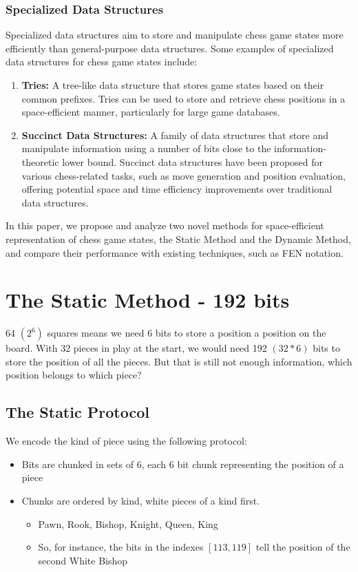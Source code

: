 \documentclass{article}
\begin{document}
\subsubsection{Specialized Data Structures}  
Specialized data structures aim to store and manipulate chess game states more efficiently than general-purpose data structures. Some examples of specialized data structures for chess game states include:  
   
\begin{enumerate}  
  \item \textbf{Tries:} A tree-like data structure that stores game states based on their common prefixes. Tries can be used to store and retrieve chess positions in a space-efficient manner, particularly for large game databases.  
    
  \item \textbf{Succinct Data Structures:} A family of data structures that store and manipulate information using a number of bits close to the information-theoretic lower bound. Succinct data structures have been proposed for various chess-related tasks, such as move generation and position evaluation, offering potential space and time efficiency improvements over traditional data structures.  
\end{enumerate}  
   
In this paper, we propose and analyze two novel methods for space-efficient representation of chess game states, the Static Method and the Dynamic Method, and compare their performance with existing techniques, such as FEN notation.

\newpage
\section{The Static Method - 192 bits}
64 $(2^6)$ squares means we need 6 bits to store a position a position on the board. With 32 pieces in play at the start, we would need 192 $(32 * 6)$ bits to store the position of all the pieces. But that is still not enough information, which position belongs to which piece?

\subsection{The Static Protocol}
We encode the kind of piece using the following  protocol:
\begin{itemize}
    \item Bits are chunked in sets of 6, each 6 bit chunk representing the position of a piece
    \item Chunks are ordered by kind, white pieces of a kind first.
        \begin{itemize}
            \item Pawn, Rook, Bishop, Knight, Queen, King
            \item So, for instance, the bits in the indexes $[113, 119]$ tell the position of the second White Bishop
        \end{itemize}
\end{itemize}
\end{document}
